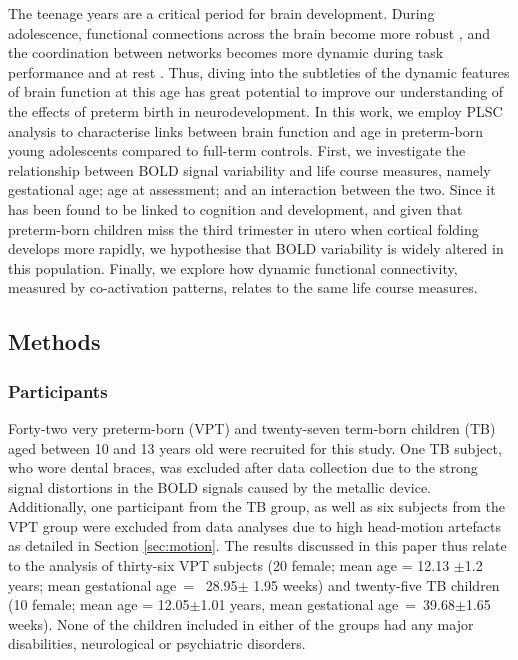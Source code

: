   
     The teenage years are a critical period for brain development. During adolescence, functional connections across the brain become more robust \citep{Power2010}, and the coordination between networks becomes more dynamic during task performance \citep{Hutchison2015} and at rest \citep{Marusak2017, Faghiri2018}. Thus, diving into the subtleties of the dynamic features of brain function at this age has great potential to improve our understanding of the effects of preterm birth in neurodevelopment. In this work, we employ PLSC analysis to characterise links between brain function and age in preterm-born young adolescents compared to full-term controls. First, we investigate the relationship between BOLD signal variability and life course measures, namely gestational age; age at assessment; and an interaction between the two. Since it has been found to be linked to cognition and development, and given that preterm-born children miss the third trimester in utero when cortical folding develops more rapidly, we hypothesise that BOLD variability is widely altered in this population. Finally, we explore how dynamic functional connectivity, measured by co-activation patterns, relates to the same life course measures. 




\subsection{Methods}

\subsubsection{Participants}
Forty-two very preterm-born (VPT) and twenty-seven term-born children (TB) aged between 10 and 13 years old were recruited for this study. One TB subject, who wore dental braces, was excluded after data collection due to the strong signal distortions in the BOLD signals caused by the metallic device. Additionally, one participant from the TB group, as well as six subjects from the VPT group were excluded from data analyses due to high head-motion artefacts as detailed in Section \ref{sec:motion}. The results discussed in this paper thus relate to the analysis of thirty-six VPT subjects (20 female; mean age = 12.13 $\pm$1.2 years; mean gestational age~=~ 28.95$\pm$ 1.95 weeks) and twenty-five TB children (10 female; mean age = 12.05$\pm$1.01 years, mean gestational age~=~39.68$\pm$1.65 weeks). None of the children included in either of the groups had any major disabilities, neurological or psychiatric disorders.    

